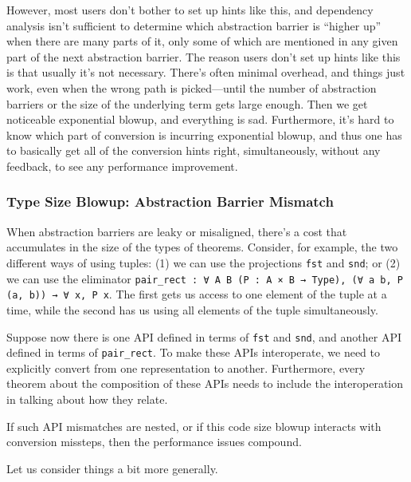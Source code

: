 However, most users don't bother to set up hints like this, and dependency analysis isn't sufficient to determine which abstraction barrier is ``higher up'' when there are many parts of it, only some of which are mentioned in any given part of the next abstraction barrier.
The reason users don't set up hints like this is that usually it's not necessary.
There's often minimal overhead, and things just work, even when the wrong path is picked---until the number of abstraction barriers or the size of the underlying term gets large enough.
Then we get noticeable exponential blowup, and everything is sad.
Furthermore, it's hard to know which part of conversion is incurring exponential blowup, and thus one has to basically get all of the conversion hints right, simultaneously, without any feedback, to see any performance improvement.



\subsubsection{Type Size Blowup: Abstraction Barrier Mismatch} \label{sec:abstraction-barriers:mismatch}
When abstraction barriers are leaky or misaligned, there's a cost that accumulates in the size of the types of theorems.
Consider, for example, the two different ways of using tuples:
(1) we can use the projections \texttt{fst} and \texttt{snd}; or
(2) we can use the eliminator \texttt{pair_rect : ∀ A B (P : A × B → Type), (∀ a b, P (a, b)) → ∀ x, P x}.
The first gets us access to one element of the tuple at a time, while the second has us using all elements of the tuple simultaneously.

Suppose now there is one API defined in terms of \texttt{fst} and \texttt{snd}, and another API defined in terms of \texttt{pair_rect}.
To make these APIs interoperate, we need to explicitly convert from one representation to another.
Furthermore, every theorem about the composition of these APIs needs to include the interoperation in talking about how they relate.

If such API mismatches are nested, or if this code size blowup interacts with conversion missteps, then the performance issues compound.



\label{sec:abstraction-barriers:mismatch:example:exponential-laws:main-text}
Let us consider things a bit more generally.

